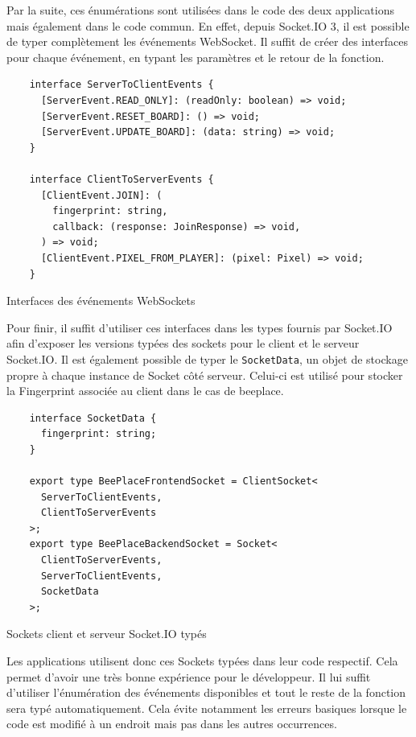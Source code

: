 Par la suite, ces énumérations sont utilisées dans le code des deux applications mais également dans le code commun. En effet, depuis Socket.IO 3, il est possible de typer complètement les événements WebSocket. Il suffit de créer des interfaces pour chaque événement, en typant les paramètres et le retour de la fonction.

\begin{listing}[H]
  \begin{verbatim}
    interface ServerToClientEvents {
      [ServerEvent.READ_ONLY]: (readOnly: boolean) => void;
      [ServerEvent.RESET_BOARD]: () => void;
      [ServerEvent.UPDATE_BOARD]: (data: string) => void;
    }

    interface ClientToServerEvents {
      [ClientEvent.JOIN]: (
        fingerprint: string,
        callback: (response: JoinResponse) => void,
      ) => void;
      [ClientEvent.PIXEL_FROM_PLAYER]: (pixel: Pixel) => void;
    }
\end{verbatim}
  \caption{Interfaces des événements WebSockets}
  \label{listing:websockets-events-interfaces}
\end{listing}

Pour finir, il suffit d'utiliser ces interfaces dans les types fournis par Socket.IO afin d'exposer les versions typées des sockets pour le client et le serveur Socket.IO. Il est également possible de typer le \texttt{SocketData}, un objet de stockage propre à chaque instance de Socket côté serveur. Celui-ci est utilisé pour stocker la Fingerprint associée au client dans le cas de \gls{beeplace}.

\begin{listing}[H]
  \begin{verbatim}
    interface SocketData {
      fingerprint: string;
    }

    export type BeePlaceFrontendSocket = ClientSocket<
      ServerToClientEvents,
      ClientToServerEvents
    >;
    export type BeePlaceBackendSocket = Socket<
      ClientToServerEvents,
      ServerToClientEvents,
      SocketData
    >;
\end{verbatim}
  \caption{Sockets client et serveur Socket.IO typés}
  \label{listing:typed-socket-io}
\end{listing}

Les applications utilisent donc ces Sockets typées dans leur code respectif. Cela permet d'avoir une très bonne expérience pour le développeur. Il lui suffit d'utiliser l'énumération des événements disponibles et tout le reste de la fonction sera typé automatiquement. Cela évite notamment les erreurs basiques lorsque le code est modifié à un endroit mais pas dans les autres occurrences.
